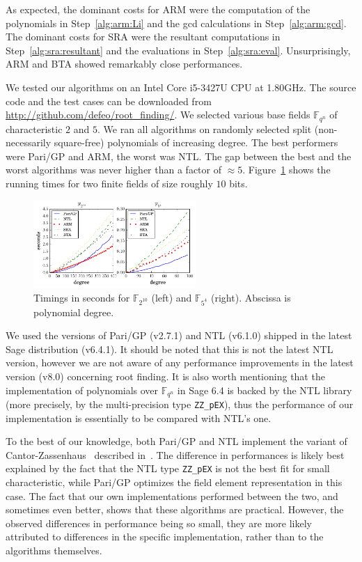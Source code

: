 \documentclass{sig-alternate}
\newcommand{\ff}[1]{\mathbb{F}_{#1}}
\newcommand{\qq}{q}
\newcommand{\nn}{n}
\newcommand{\qn}{{\qq^\nn}}
\newcommand{\extf}{\ff{\qn}}
\newcounter{algo}
\begin{document}
As expected, the dominant costs for ARM were the computation of the
polynomials in Step~\ref{alg:arm:Li} and the gcd calculations in
Step~\ref{alg:arm:gcd}. The dominant costs for SRA were the resultant
computations in Step~\ref{alg:sra:resultant} and the evaluations in
Step~\ref{alg:sra:eval}. Unsurprisingly, ARM and BTA showed remarkably
close performances.

We tested our algorithms on an Intel Core i5-3427U CPU at 1.80GHz. The
source code and the test cases can be downloaded from
\url{http://github.com/defeo/root_finding/}. We selected various base
fields $\extf$ of characteristic $2$ and $5$. We ran all algorithms on
randomly selected split (non-necessarily square-free) polynomials of
increasing degree. The best performers were Pari/GP and ARM, the worst
was NTL. The gap between the best and the worst algorithms was never
higher than a factor of $\approx 5$. Figure~\ref{fig:benchmarks} shows
the running times for two finite fields of size roughly $10$ bits.

\begin{figure}
  \hspace{-0.05\textwidth}
  \includegraphics[width=0.55\textwidth]{benchmark}
  \caption{Timings in seconds for $\ff{2^{10}}$ (left) and $\ff{5^4}$
    (right). Abscissa is polynomial degree.}
  \label{fig:benchmarks}
\end{figure}

We used the versions of Pari/GP (v2.7.1) and NTL (v6.1.0) shipped in
the latest Sage distribution (v6.4.1). It should be noted that this is
not the latest NTL version, however we are not aware of any
performance improvements in the latest version (v8.0) concerning root
finding. It is also worth mentioning that the implementation of
polynomials over $\extf$ in Sage 6.4 is backed by the NTL library
(more precisely, by the multi-precision type \texttt{ZZ\_pEX}), thus
the performance of our implementation is essentially to be compared
with NTL's one.

To the best of our knowledge, both Pari/GP and NTL implement the
variant of Cantor-Zassenhaus~\cite{cantor1981} described
in~\cite{GathenS92}. The difference in performances is likely best
explained by the fact that the NTL type \texttt{ZZ\_pEX} is not the
best fit for small characteristic, while Pari/GP optimizes the field
element representation in this case. The fact that our own
implementations performed between the two, and sometimes even better,
shows that these algorithms are practical. However, the observed
differences in performance being so small, they are more likely
attributed to differences in the specific implementation, rather than
to the algorithms themselves.
\end{document}
